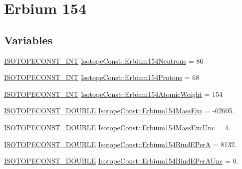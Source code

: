 \hypertarget{group___isotope_const-_erbium-_er154}{}\section{Erbium 154}
\label{group___isotope_const-_erbium-_er154}
\subsection*{Variables}
\begin{DoxyCompactItemize}
\item 
\mbox{\hyperlink{group___isotope_const-_macros_ga5f18360b3e99483a35c32d789e62621c}{I\+S\+O\+T\+O\+P\+E\+C\+O\+N\+S\+T\+\_\+\+I\+NT}} \mbox{\hyperlink{group___isotope_const-_erbium-_er154_gac4b090c907fb0c58a1348b5fd37ca2f2}{Isotope\+Const\+::\+Erbium154\+Neutrons}} = 86
\item 
\mbox{\hyperlink{group___isotope_const-_macros_ga5f18360b3e99483a35c32d789e62621c}{I\+S\+O\+T\+O\+P\+E\+C\+O\+N\+S\+T\+\_\+\+I\+NT}} \mbox{\hyperlink{group___isotope_const-_erbium-_er154_ga70295fe01df82a1c60b5009981f01b41}{Isotope\+Const\+::\+Erbium154\+Protons}} = 68
\item 
\mbox{\hyperlink{group___isotope_const-_macros_ga5f18360b3e99483a35c32d789e62621c}{I\+S\+O\+T\+O\+P\+E\+C\+O\+N\+S\+T\+\_\+\+I\+NT}} \mbox{\hyperlink{group___isotope_const-_erbium-_er154_gaf203cd8688c4ca77d1c36f9d85d41e76}{Isotope\+Const\+::\+Erbium154\+Atomic\+Weight}} = 154
\item 
\mbox{\hyperlink{group___isotope_const-_macros_ga8f45a7272ce02c0b4c65c44636ed719a}{I\+S\+O\+T\+O\+P\+E\+C\+O\+N\+S\+T\+\_\+\+D\+O\+U\+B\+LE}} \mbox{\hyperlink{group___isotope_const-_erbium-_er154_ga5a1fa4340e2efb67f464f835e1499974}{Isotope\+Const\+::\+Erbium154\+Mass\+Exc}} = -\/62605.
\item 
\mbox{\hyperlink{group___isotope_const-_macros_ga8f45a7272ce02c0b4c65c44636ed719a}{I\+S\+O\+T\+O\+P\+E\+C\+O\+N\+S\+T\+\_\+\+D\+O\+U\+B\+LE}} \mbox{\hyperlink{group___isotope_const-_erbium-_er154_ga8270ed78c34bcd41da03340b35f35fee}{Isotope\+Const\+::\+Erbium154\+Mass\+Exc\+Unc}} = 4.
\item 
\mbox{\hyperlink{group___isotope_const-_macros_ga8f45a7272ce02c0b4c65c44636ed719a}{I\+S\+O\+T\+O\+P\+E\+C\+O\+N\+S\+T\+\_\+\+D\+O\+U\+B\+LE}} \mbox{\hyperlink{group___isotope_const-_erbium-_er154_gaecaa7b603cf16eaa7a7270549569c843}{Isotope\+Const\+::\+Erbium154\+Bind\+E\+PerA}} = 8132.
\item 
\mbox{\hyperlink{group___isotope_const-_macros_ga8f45a7272ce02c0b4c65c44636ed719a}{I\+S\+O\+T\+O\+P\+E\+C\+O\+N\+S\+T\+\_\+\+D\+O\+U\+B\+LE}} \mbox{\hyperlink{group___isotope_const-_erbium-_er154_ga813a4a8d654913cda71b046e3568ba40}{Isotope\+Const\+::\+Erbium154\+Bind\+E\+Per\+A\+Unc}} = 0.

\end{DoxyCompactItemize}
